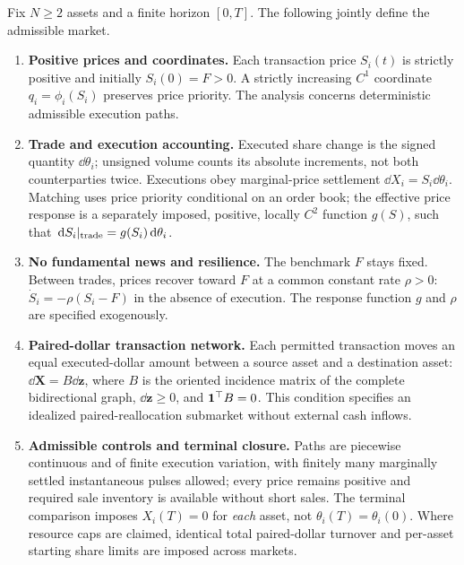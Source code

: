 \documentclass[review,hidelinks,onefignum,onetabnum]{siamonline250211}
\begin{document}
\begin{assumption}\label{asmp:model}
Fix $N\ge2$ assets and a finite horizon $[0,T]$. The following jointly define the admissible market.
\begin{enumerate}[label=\textup{(M\arabic*)},leftmargin=2.9em,itemsep=0.20em]
\item \textbf{Positive prices and coordinates.} Each transaction price $S_i(t)$ is strictly positive and initially $S_i(0)=F>0$. A strictly increasing $C^1$ coordinate $q_i=\phi_i(S_i)$ preserves price priority. The analysis concerns deterministic admissible execution paths.
\item \textbf{Trade and execution accounting.} Executed share change is the signed quantity $\dd\theta_i$; unsigned volume counts its absolute increments, not both counterparties twice. Executions obey marginal-price settlement $\dd X_i=S_i\dd\theta_i$. Matching uses price priority conditional on an order book; the effective price response is a separately imposed, positive, locally $C^2$ function $g(S)$, such that $\,\mathrm{d} S_i|_{\rm trade}=g(S_i)\,\mathrm{d}\theta_i$.
\item \textbf{No fundamental news and resilience.} The benchmark $F$ stays fixed. Between trades, prices recover toward $F$ at a common constant rate $\rho>0$: $\dot S_i=-\rho(S_i-F)$ in the absence of execution. The response function $g$ and $\rho$ are specified exogenously.
\item \textbf{Paired-dollar transaction network.} Each permitted transaction moves an equal executed-dollar amount between a source asset and a destination asset: $\dd\bm X=B\dd\bm z$, where $B$ is the oriented incidence matrix of the complete bidirectional graph, $\dd\bm z\ge0$, and $\mathbf{1}^\top B=0$. This condition specifies an idealized paired-reallocation submarket without external cash inflows.
\item \textbf{Admissible controls and terminal closure.} Paths are piecewise continuous and of finite execution variation, with finitely many marginally settled instantaneous pulses allowed; every price remains positive and required sale inventory is available without short sales. The terminal comparison imposes $X_i(T)=0$ for \emph{each} asset, not $\theta_i(T)=\theta_i(0)$. Where resource caps are claimed, identical total paired-dollar turnover and per-asset starting share limits are imposed across markets.
\end{enumerate}
\end{assumption}
\end{document}
